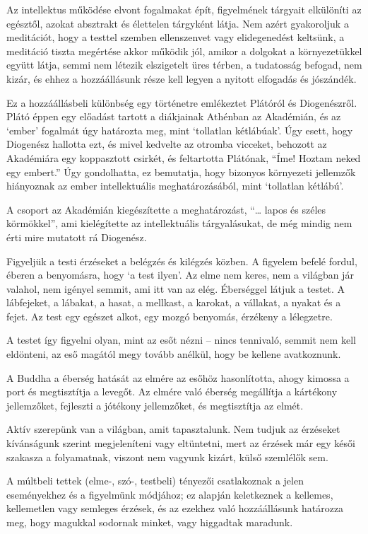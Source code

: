 Az intellektus működése elvont fogalmakat épít, figyelmének tárgyait
elkülöníti az egésztől, azokat absztrakt és élettelen tárgyként látja.
Nem azért gyakoroljuk a meditációt, hogy a testtel szemben ellenszenvet
vagy elidegenedést keltsünk, a meditáció tiszta megértése akkor működik
jól, amikor a dolgokat a környezetükkel együtt látja, semmi nem létezik
elszigetelt üres térben, a tudatosság befogad, nem kizár, és ehhez a
hozzáállásunk része kell legyen a nyitott elfogadás és jószándék.

Ez a hozzáállásbeli különbség egy történetre emlékeztet Plátóról és
Diogenészről. Plátó éppen egy előadást tartott a diákjainak Athénban az
Akadémián, és az `ember' fogalmát úgy határozta meg, mint `tollatlan
kétlábúak'. Úgy esett, hogy Diogenész hallotta ezt, és mivel kedvelte az
otromba vicceket, behozott az Akadémiára egy koppasztott csirkét, és
feltartotta Plátónak, ``Íme! Hoztam neked egy embert.'' Úgy gondolhatta,
ez bemutatja, hogy bizonyos környezeti jellemzők hiányoznak az ember
intellektuális meghatározásából, mint `tollatlan kétlábú'.

A csoport az Akadémián kiegészítette a meghatározást, ``\ldots{} lapos
és széles körmökkel'', ami kielégítette az intellektuális tárgyalásukat,
de még mindig nem érti mire mutatott rá Diogenész.

Figyeljük a testi érzéseket a belégzés és kilégzés közben. A figyelem
befelé fordul, éberen a benyomásra, hogy `a test ilyen'. Az elme nem
keres, nem a világban jár valahol, nem igényel semmit, ami itt van az
elég. Éberséggel látjuk a testet. A lábfejeket, a lábakat, a hasat, a
mellkast, a karokat, a vállakat, a nyakat és a fejet. Az test egy
egészet alkot, egy mozgó benyomás, érzékeny a lélegzetre.

A testet így figyelni olyan, mint az esőt nézni -- nincs tennivaló,
semmit nem kell eldönteni, az eső magától megy tovább anélkül, hogy be
kellene avatkoznunk.

A Buddha a éberség hatását az elmére az esőhöz hasonlította, ahogy
kimossa a port és megtisztítja a levegőt. Az elmére való éberség
megállítja a kártékony jellemzőket, fejleszti a jótékony jellemzőket, és
megtisztítja az elmét.

Aktív szerepünk van a világban, amit tapasztalunk. Nem tudjuk az
érzéseket kívánságunk szerint megjeleníteni vagy eltüntetni, mert az
érzések már egy késői szakasza a folyamatnak, viszont nem vagyunk
kizárt, külső szemlélők sem.

A múltbeli tettek (elme-, szó-, testbeli) tényezői csatlakoznak a jelen
eseményekhez és a figyelmünk módjához; ez alapján keletkeznek a
kellemes, kellemetlen vagy semleges érzések, és az ezekhez való
hozzáállásunk határozza meg, hogy magukkal sodornak minket, vagy
higgadtak maradunk.

